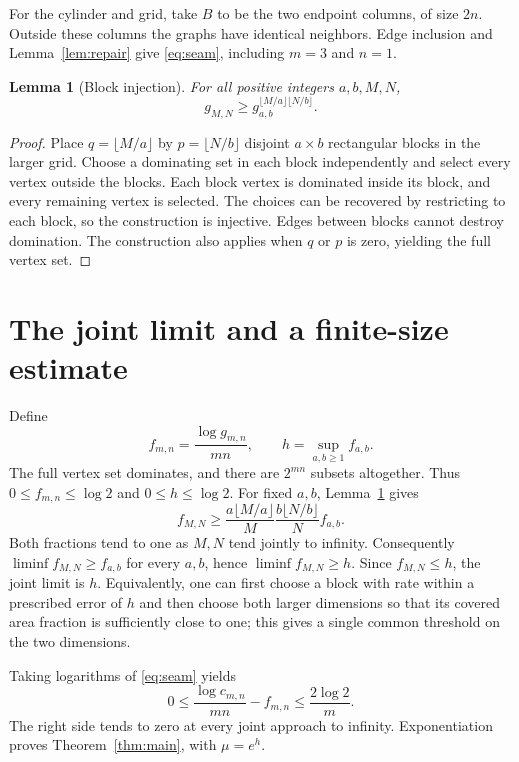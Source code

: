 \documentclass[11pt]{article}
\newtheorem{lemma}[theorem]{Lemma}
\begin{document}
For the cylinder and grid, take $B$ to be the two endpoint columns,
of size $2n$. Outside these columns the graphs have identical neighbors.
Edge inclusion and Lemma~\ref{lem:repair} give \eqref{eq:seam}, including
$m=3$ and $n=1$.

\begin{lemma}[Block injection]\label{lem:block}
For all positive integers $a,b,M,N$,
\begin{equation}\label{eq:block}
 g_{M,N}\ge g_{a,b}^{\lfloor M/a\rfloor\lfloor N/b\rfloor}.
\end{equation}
\end{lemma}
\begin{proof}
Place $q=\lfloor M/a\rfloor$ by $p=\lfloor N/b\rfloor$ disjoint
$a\times b$ rectangular blocks in the larger grid. Choose a dominating
set in each block independently and select every vertex outside the
blocks. Each block vertex is dominated inside its block, and every
remaining vertex is selected. The choices can be recovered by restricting
to each block, so the construction is injective. Edges between blocks
cannot destroy domination. The construction also applies when $q$ or
$p$ is zero, yielding the full vertex set.
\end{proof}

\section{The joint limit and a finite-size estimate}
Define
\[
 f_{m,n}=\frac{\log g_{m,n}}{mn},\qquad
 h=\sup_{a,b\ge1}f_{a,b}.
\]
The full vertex set dominates, and there are $2^{mn}$ subsets altogether.
Thus $0\le f_{m,n}\le\log2$ and $0\le h\le\log2$.
For fixed $a,b$, Lemma~\ref{lem:block} gives
\[
 f_{M,N}\ge
 \frac{a\lfloor M/a\rfloor}{M}
 \frac{b\lfloor N/b\rfloor}{N}f_{a,b}.
\]
Both fractions tend to one as $M,N$ tend jointly to infinity. Consequently
$\liminf f_{M,N}\ge f_{a,b}$ for every $a,b$, hence
$\liminf f_{M,N}\ge h$. Since $f_{M,N}\le h$, the joint limit is $h$.
Equivalently, one can first choose a block with rate within a prescribed
error of $h$ and then choose both larger dimensions so that its covered
area fraction is sufficiently close to one; this gives a single common
threshold on the two dimensions.

Taking logarithms of \eqref{eq:seam} yields
\begin{equation}\label{eq:rate}
 0\le\frac{\log c_{m,n}}{mn}-f_{m,n}
 \le\frac{2\log2}{m}.
\end{equation}
The right side tends to zero at every joint approach to infinity.
Exponentiation proves Theorem~\ref{thm:main}, with $\mu=e^h$.
\end{document}
